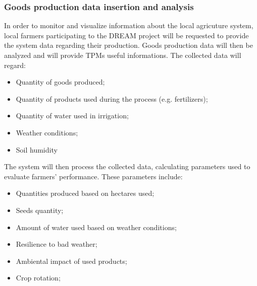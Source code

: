 \documentclass[10pt]{article}
\begin{document}
\subsubsection{Goods production data insertion and analysis}
In order to monitor and visualize information about the local agricuture system, local farmers participating to the DREAM project 
will be requested to provide the system data regarding their production. Goods production data will then be analyzed and will provide TPMs 
useful informations. 
The collected data will regard:
\begin{itemize}
    \item Quantity of goods produced;
    \item Quantity of products used during the process (e.g. fertilizers);
    \item Quantity of water used in irrigation;
    \item Weather conditions;
    \item Soil humidity
\end{itemize}
The system will then process the collected data, calculating parameters used to evaluate farmers' performance. These parameters include:
\begin{itemize}
    \item Quantities produced based on hectares used;
    \item Seeds quantity;
    \item Amount of water used based on weather conditions;
    \item Resilience to bad weather;
    \item Ambiental impact of used products;
    \item Crop rotation;
\end{itemize}
\end{document}
